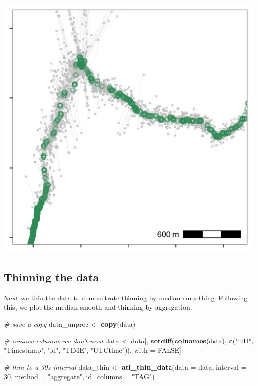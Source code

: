 \documentclass[]{scrartcl}
\newenvironment{Shaded}{}{}
\newcommand{\CommentTok}[1]{\textcolor[rgb]{0.38,0.63,0.69}{\textit{#1}}}
\newcommand{\DataTypeTok}[1]{\textcolor[rgb]{0.56,0.13,0.00}{#1}}
\newcommand{\DecValTok}[1]{\textcolor[rgb]{0.25,0.63,0.44}{#1}}
\newcommand{\KeywordTok}[1]{\textcolor[rgb]{0.00,0.44,0.13}{\textbf{#1}}}
\newcommand{\NormalTok}[1]{#1}
\newcommand{\OtherTok}[1]{\textcolor[rgb]{0.00,0.44,0.13}{#1}}
\newcommand{\StringTok}[1]{\textcolor[rgb]{0.25,0.44,0.63}{#1}}
\begin{document}
\includegraphics{figures/fig_calib_median_smooth.png}

\hypertarget{thinning-the-data}{%
\subsection{Thinning the data}\label{thinning-the-data}}

Next we thin the data to demonstrate thinning by median smoothing.
Following this, we plot the median smooth and thinning by aggregation.

\begin{Shaded}
\begin{Highlighting}[]
\CommentTok{# save a copy}
\NormalTok{data_unproc <-}\StringTok{ }\KeywordTok{copy}\NormalTok{(data)}

\CommentTok{# remove columns we don't need}
\NormalTok{data <-}\StringTok{ }\NormalTok{data[, }\KeywordTok{setdiff}\NormalTok{(}\KeywordTok{colnames}\NormalTok{(data), }
                       \KeywordTok{c}\NormalTok{(}\StringTok{"tID"}\NormalTok{, }\StringTok{"Timestamp"}\NormalTok{, }\StringTok{"id"}\NormalTok{, }\StringTok{"TIME"}\NormalTok{, }\StringTok{"UTCtime"}\NormalTok{)), }
\NormalTok{             with =}\StringTok{ }\OtherTok{FALSE}\NormalTok{]}

\CommentTok{# thin to a 30s interval}
\NormalTok{data_thin <-}\StringTok{ }\KeywordTok{atl_thin_data}\NormalTok{(}\DataTypeTok{data =}\NormalTok{ data,}
                           \DataTypeTok{interval =} \DecValTok{30}\NormalTok{,}
                           \DataTypeTok{method =} \StringTok{"aggregate"}\NormalTok{,}
                           \DataTypeTok{id_columns =} \StringTok{"TAG"}\NormalTok{)}
\end{Highlighting}
\end{Shaded}
\end{document}
